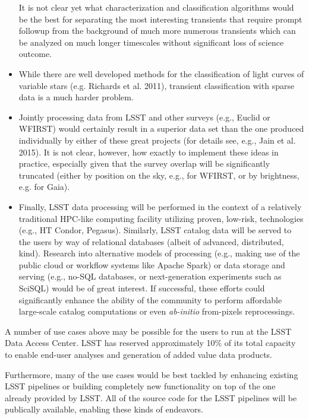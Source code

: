 \documentclass{iau}
\begin{document}
\begin{itemize}
It is not clear yet what characterization and classification algorithms would be the best for separating 
the most interesting transients that require prompt followup from the background of much more numerous
transients which can be analyzed on much longer timescales without significant loss of science outcome.
\item While there are well developed methods for the classification of light curves of variable stars
(e.g. Richards et al. 2011), transient classification with sparse data is a much harder problem. 
\item Jointly processing data from LSST and other surveys (e.g., Euclid or WFIRST) would
certainly result in a superior data set than the one produced individually
by either of these great projects (for details see, e.g., Jain et al. 2015). It is not clear, however,
how exactly to implement these ideas in practice, especially given that the survey overlap will be 
significantly truncated (either by position on the sky, e.g., for WFIRST, or by brightness, e.g. for Gaia).
\item Finally, LSST data processing will be performed in the context of a
relatively traditional HPC-like computing facility utilizing proven, low-risk,
technologies (e.g., HT Condor, Pegasus). Similarly, LSST catalog data will be served
to the users by way of relational databases (albeit of advanced, distributed, kind). Research into 
alternative models of processing (e.g., making use of the public cloud or workflow 
systems like Apache Spark) or data storage and serving (e.g., no-SQL
databases, or next-generation experiments such as SciSQL) would be of great interest.
If successful, these efforts could significantly enhance the ability of the community
to perform affordable large-scale catalog computations or even {\em ab-initio}
from-pixels reprocessings.\\
\end{itemize}

A number of use cases above may be possible for the users to
run at the LSST Data Access Center. LSST has reserved approximately 10\% of
its total capacity to enable end-user analyses and generation of added value
data products.

Furthermore, many of the use cases would be best tackled by enhancing
existing LSST pipelines or building completely new functionality on top of
the one already provided by LSST. All of the source code for the LSST
pipelines will be publically available, enabling these kinds of endeavors.
\end{document}
